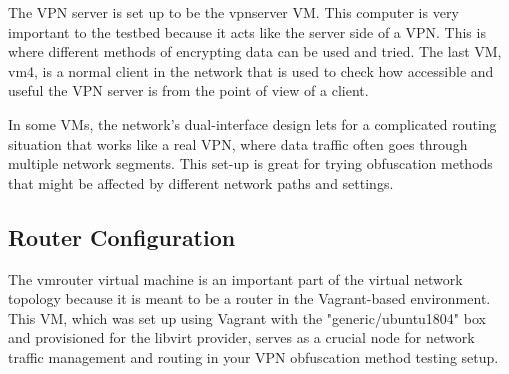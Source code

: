 \documentclass[12pt, fleqn, a4paper]{article}
\begin{document}
The VPN server is set up to be the vpnserver VM. This computer is very important to the testbed because it acts like the server side of a VPN. This is where different methods of encrypting data can be used and tried. The last VM, vm4, is a normal client in the network that is used to check how accessible and useful the VPN server is from the point of view of a client.

In some VMs, the network's dual-interface design lets for a complicated routing situation that works like a real VPN, where data traffic often goes through multiple network segments. This set-up is great for trying obfuscation methods that might be affected by different network paths and settings.


\subsection{Router Configuration}
The vmrouter virtual machine is an important part of the virtual network topology because it is meant to be a router in the Vagrant-based environment. This VM, which was set up using Vagrant with the "generic/ubuntu1804" box and provisioned for the libvirt provider, serves as a crucial node for network traffic management and routing in your VPN obfuscation method testing setup.
\end{document}
